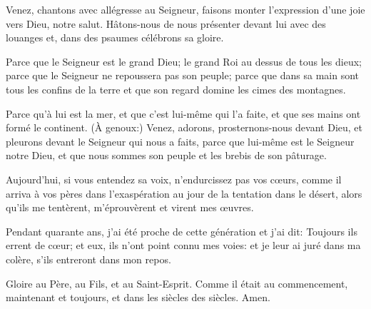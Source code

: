 \item Venez, chantons avec allégresse au Seigneur, faisons monter l'expression d'une joie vers Dieu, notre salut. Hâtons-nous de nous présenter devant lui avec des louanges et, dans des psaumes célébrons sa gloire. 
\item Parce que le Seigneur est le grand Dieu; le grand Roi au dessus de tous les dieux; parce que le Seigneur ne repoussera pas son peuple; parce que dans sa main sont tous les confins de la terre et que son regard domine les cimes des montagnes. 
\item Parce qu'à lui est la mer, et que c'est lui-même qui l'a faite, et que ses mains ont formé le continent. \rubric(À genoux:) Venez, adorons, prosternons-nous devant Dieu, et pleurons devant le Seigneur qui nous a faits, parce que lui-même est le Seigneur notre Dieu, et que nous sommes son peuple et les brebis de son pâturage. 
\item Aujourd'hui, si vous entendez sa voix, n'endurcissez pas vos cœurs, comme il arriva à vos pères dans l'exaspération au jour de la tentation dans le désert, alors qu'ils me tentèrent, m'éprouvèrent et virent mes œuvres. 
\item Pendant quarante ans, j'ai été proche de cette génération et j'ai dit: Toujours ils errent de cœur; et eux, ils n'ont point connu mes voies: et je leur ai juré dans ma colère, s'ils entreront dans mon repos. 
\item Gloire au Père, au Fils, et au Saint-Esprit. Comme il était au commencement, maintenant et toujours, et dans les siècles des siècles. Amen. 